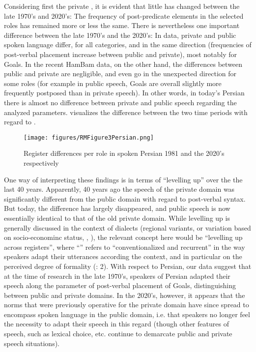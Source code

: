 \documentclass[output=paper,colorlinks,citecolor=brown,draftmode]{langscibook}
\begin{document}
Considering first the private , it is evident that little has changed between the late 1970's and 2020's: The frequency of post-predicate elements in the selected roles has remained more or less the same. There is nevertheless one important difference between the late 1970's and the 2020's: In  data, private and public spoken language differ, for all categories, and in the same direction (frequencies of post-verbal placement increase between public and private), most notably for Goals. In the recent HamBam data, on the other hand, the differences between public and private are negligible, and even go in the unexpected direction for some roles (for example in public speech, Goals are overall slightly more frequently postposed than in private speech). In other words, in today's Persian there is almost no difference between private and public speech regarding the analyzed parameters.  visualizes the difference between the two time periods with regard to .

\begin{figure}
 \texttt{[image: figures/RMFigure3Persian.png]}
 \caption{Register differences per role in spoken Persian 1981 and the 2020's respectively}
 \label{Persian:fig:3}
\end{figure}

One way of interpreting these findings is in terms of ``levelling up'' over the the last 40 years. Apparently, 40 years ago the speech of the private domain was significantly different from the public domain with regard to post-verbal syntax. But today, the difference has largely disappeared, and public speech is now essentially identical to that of the old private domain. While levelling up is generally discussed in the context of dialects (regional variants, or variation based on socio-econominc status, \citealt[200]{Dillard1972BlackE}, \citealt[98--99]{Trudgill1986Dialects}), the relevant concept here would be ``levelling up across registers'', where ``'' refers to ``conventionalized and recurrent''  in the way speakers adapt their utterances according the context, and in particular on the perceived degree of formality (\citealt{pescumaetal2023situating}: 2). With respect to Persian, our data suggest that at the time of  research in the late 1970's, speakers of Persian adapted their speech along the parameter of post-verbal placement of Goals, distinguishing between public and private domains. In the 2020's, however, it appears that the norms that were previously operative for the private domain have since spread to encompass spoken language in the public domain, i.e. that speakers no longer feel the necessity to adapt their speech in this regard (though other features of speech, such as lexical choice,  etc. continue to demarcate public and private speech situations).
\end{document}
